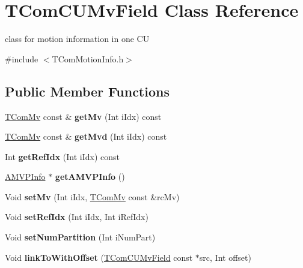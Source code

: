 \hypertarget{class_t_com_c_u_mv_field}{}\section{T\+Com\+C\+U\+Mv\+Field Class Reference}
\label{class_t_com_c_u_mv_field}


class for motion information in one CU  




{\ttfamily \#include $<$T\+Com\+Motion\+Info.\+h$>$}

\subsection*{Public Member Functions}
\begin{DoxyCompactItemize}
\item 
\mbox{\label{class_t_com_c_u_mv_field_a289e5f3f0ce07f695fcd566a20f26d8d}} 
\hyperlink{class_t_com_mv}{T\+Com\+Mv} const  \& {\bfseries get\+Mv} (Int i\+Idx) const
\item 
\mbox{\label{class_t_com_c_u_mv_field_a7ee899b48321d4a03888e94871b0fea7}} 
\hyperlink{class_t_com_mv}{T\+Com\+Mv} const  \& {\bfseries get\+Mvd} (Int i\+Idx) const
\item 
\mbox{\label{class_t_com_c_u_mv_field_aba21a5bca7a53b92766ff4c3bfc0b16f}} 
Int {\bfseries get\+Ref\+Idx} (Int i\+Idx) const
\item 
\mbox{\label{class_t_com_c_u_mv_field_ade093161258af55a7d9c65195684619d}} 
\hyperlink{_t_com_motion_info_8h_a4dfe7465dec69a9356d5166304173f8c}{A\+M\+V\+P\+Info} $\ast$ {\bfseries get\+A\+M\+V\+P\+Info} ()
\item 
\mbox{\label{class_t_com_c_u_mv_field_a7db249b5d4a80926595e0bedafdafff8}} 
Void {\bfseries set\+Mv} (Int i\+Idx, \hyperlink{class_t_com_mv}{T\+Com\+Mv} const \&rc\+Mv)
\item 
\mbox{\label{class_t_com_c_u_mv_field_ab4b28a29867820f75ad594732ab36b4f}} 
Void {\bfseries set\+Ref\+Idx} (Int i\+Idx, Int i\+Ref\+Idx)
\item 
\mbox{\label{class_t_com_c_u_mv_field_ada099536226b785cfbe1bcb18b560572}} 
Void {\bfseries set\+Num\+Partition} (Int i\+Num\+Part)
\item 
\mbox{\label{class_t_com_c_u_mv_field_a4a12f59df4b0fa791c82e53487faca8e}} 
Void {\bfseries link\+To\+With\+Offset} (\hyperlink{class_t_com_c_u_mv_field}{T\+Com\+C\+U\+Mv\+Field} const $\ast$src, Int offset)
\end{DoxyCompactItemize}
